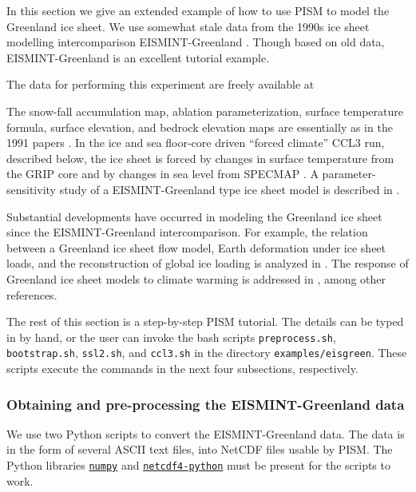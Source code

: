 \documentclass[11pt,final]{amsart}
\begin{document}
In this section we give an extended example of how to use PISM to model the Greenland ice sheet.  We use somewhat stale data from the 1990s ice sheet modelling intercomparison EISMINT-Greenland \cite{HuybrechtsEISMINT,RitzEISMINT}.  Though based on old data, EISMINT-Greenland is an excellent tutorial example.

The data for performing this experiment are freely available at
\medskip

\centerline{}
\medskip

\noindent The snow-fall accumulation map, ablation parameterization, surface temperature formula, surface elevation, and bedrock elevation maps are essentially as in the 1991 papers \cite{Letreguillyetal1991,OhmuraReeh}.  In the ice and sea floor-core driven ``forced climate'' CCL3 run, described below, the ice sheet is forced by changes in surface temperature from the GRIP core \cite{Dansgaardetal1993} and by changes in sea level from SPECMAP \cite{Imbrieetal1984}.  A parameter-sensitivity study of a EISMINT-Greenland type ice sheet model is described in \cite{RitzFabreLetreguilly}.

Substantial developments have occurred in modeling the Greenland ice sheet since the EISMINT-Greenland intercomparison.  For example, the relation between a Greenland ice sheet flow model, Earth deformation under ice sheet loads, and the reconstruction of global ice loading is analyzed in \cite{TarasovPeltier}.  The response of Greenland ice sheet models to climate warming is addressed in \cite{HuybrechtsdeWolde,Huybrechts02, Greve00}, among other references.

The rest of this section is a step-by-step PISM tutorial.  The details can be typed in by hand, or the user can invoke the bash scripts \verb|preprocess.sh|, \verb|bootstrap.sh|, \verb|ssl2.sh|, and \verb|ccl3.sh| in the directory \verb|examples/eisgreen|.  These scripts execute the commands in the next four subsections, respectively.

\subsubsection*{Obtaining and pre-processing the EISMINT-Greenland data}  We use two Python scripts to convert the EISMINT-Greenland data.  The data is in the form of several ASCII text files, into NetCDF files usable by PISM.  The Python libraries \href{http://numpy.scipy.org/}{\texttt{numpy}} and \href{http://code.google.com/p/netcdf4-python/}{\texttt{netcdf4-python}} must be present for the scripts to work.
\end{document}

